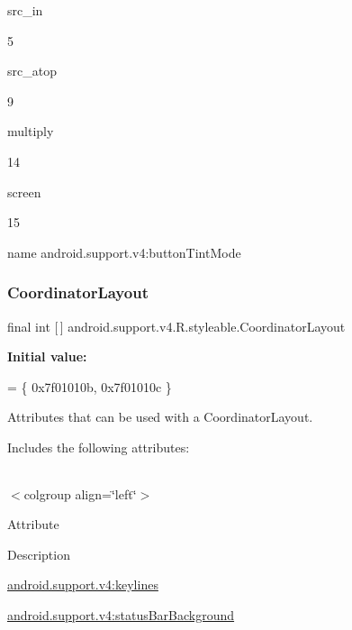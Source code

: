 {\ttfamily src\+\_\+in}

5

{\ttfamily src\+\_\+atop}

9

{\ttfamily multiply}

14

{\ttfamily screen}

15

name android.\+support.\+v4\+:button\+Tint\+Mode \mbox{\label{classandroid_1_1support_1_1v4_1_1R_1_1styleable_a94a213ce8a987dc40a09f872e7b309c5}} 
\subsubsection{\texorpdfstring{Coordinator\+Layout}{CoordinatorLayout}}
{\footnotesize\ttfamily final int \mbox{[}$\,$\mbox{]} android.\+support.\+v4.\+R.\+styleable.\+Coordinator\+Layout\hspace{0.3cm}{\ttfamily [static]}}

{\bfseries Initial value\+:}
\begin{DoxyCode}
= \{
            0x7f01010b, 0x7f01010c
        \}
\end{DoxyCode}
Attributes that can be used with a Coordinator\+Layout. 

Includes the following attributes\+:

\tabulinesep=1mm
\begin{longtabu} spread 0pt [c]{*{0}{|X[-1]}|}
\hline
\end{longtabu}
$<$colgroup align=\char`\"{}left\char`\"{}$>$ 

Attribute

Description 

{\ttfamily \hyperlink{classandroid_1_1support_1_1v4_1_1R_1_1styleable_a45331911c9dab41ebfce37bf8248393e}{android.\+support.\+v4\+:keylines}}

{\ttfamily \hyperlink{classandroid_1_1support_1_1v4_1_1R_1_1styleable_aaae28c830112a89e52658afe0c8b24dc}{android.\+support.\+v4\+:status\+Bar\+Background}}

